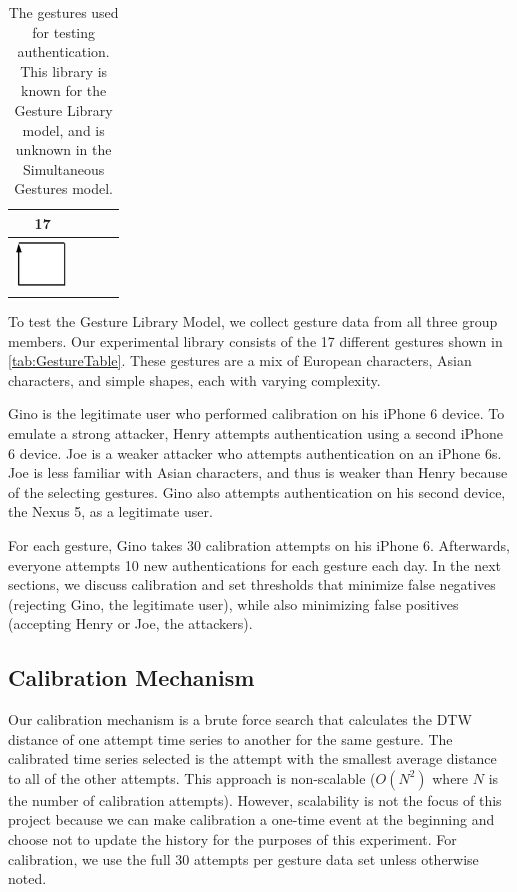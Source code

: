 \begin{table}
\begin{center}
\begin{tabular}{ c | c | c | c  }
    17    \\ \hline
    \includegraphics[width=0.2\linewidth, height=13mm]{./figures/gesture_17.png} \\ \hline
  \end{tabular}
\end{center}
\caption{The gestures used for testing authentication. This library is known for the Gesture Library model, and is unknown in the Simultaneous Gestures model.} %
\label{table:GestureTable}
\end{table}


To test the Gesture Library Model, we collect gesture data from all three group members. Our experimental library consists of the 17 different gestures shown in \autoref{tab:GestureTable}. These gestures are a mix of European characters, Asian characters, and simple shapes, each with varying complexity. 

Gino is the legitimate user who performed calibration on his iPhone 6 device. To emulate a strong attacker, Henry attempts authentication using a second iPhone 6 device. Joe is a weaker attacker who attempts authentication on an iPhone 6s. Joe is less familiar with Asian characters, and thus is weaker than Henry because of the selecting gestures. Gino also attempts authentication on his second device, the Nexus 5, as a legitimate user.

For each gesture, Gino takes 30 calibration attempts on his iPhone 6. Afterwards, everyone attempts 10 new authentications for each gesture each day. In the next sections, we discuss calibration and set thresholds that minimize false negatives (rejecting Gino, the legitimate user), while also minimizing false positives (accepting Henry or Joe, the attackers).

\subsection{Calibration Mechanism}

Our calibration mechanism is a brute force search that calculates the \gls{DTW} distance of one attempt time series to another for the same gesture. The calibrated time series selected is the attempt with the smallest average distance to all of the other attempts. This approach is non-scalable ($O(N^{2})$ where $N$ is the number of calibration attempts). However, scalability is not the focus of this project because we can make calibration a one-time event at the beginning and choose not to update the history for the purposes of this experiment. For calibration, we use the full 30 attempts per gesture data set unless otherwise noted.

